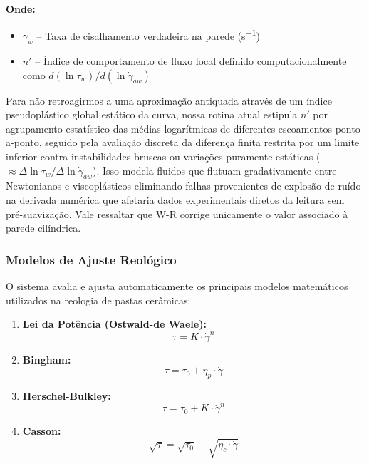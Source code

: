 \documentclass[a4paper,12pt]{article}
\begin{document}
\textbf{Onde:}
\begin{itemize}[leftmargin=1.5em]
  \item $\dot{\gamma}_w$ -- Taxa de cisalhamento verdadeira na parede (\si{s^{-1}})
  \item $n'$ -- Índice de comportamento de fluxo local definido computacionalmente como $d(\ln \tau_w) / d(\ln \dot{\gamma}_{aw})$
\end{itemize}

Para não retroagirmos a uma aproximação antiquada através de um índice pseudoplástico global estático da curva, nossa rotina atual estipula $n'$ por agrupamento estatístico das médias logarítmicas de diferentes escoamentos ponto-a-ponto, seguido pela avaliação discreta da diferença finita restrita por um limite inferior contra instabilidades bruscas ou variações puramente estáticas ($\approx \Delta \ln \tau_w / \Delta \ln \dot{\gamma}_{aw}$). Isso modela fluidos que flutuam gradativamente entre Newtonianos e viscoplásticos eliminando falhas provenientes de explosão de ruído na derivada numérica que afetaria dados experimentais diretos da leitura sem pré-suavização. Vale ressaltar que W-R corrige unicamente o valor associado à parede cilíndrica.

\subsubsection*{Modelos de Ajuste Reológico}
O sistema avalia e ajusta automaticamente os principais modelos matemáticos utilizados na reologia de pastas cerâmicas:

\begin{enumerate}[label=(\alph*)]
  \item \textbf{Lei da Potência (Ostwald-de Waele):}
  \begin{equation} \tau = K \cdot \dot{\gamma}^n \end{equation}
  \item \textbf{Bingham:}
  \begin{equation} \tau = \tau_0 + \eta_p \cdot \dot{\gamma} \end{equation}
  \item \textbf{Herschel-Bulkley:}
  \begin{equation} \tau = \tau_0 + K \cdot \dot{\gamma}^n \end{equation}
  \item \textbf{Casson:}
  \begin{equation} \sqrt{\tau} = \sqrt{\tau_0} + \sqrt{\eta_c \cdot \dot{\gamma}} \end{equation}
\end{enumerate}
\end{document}
